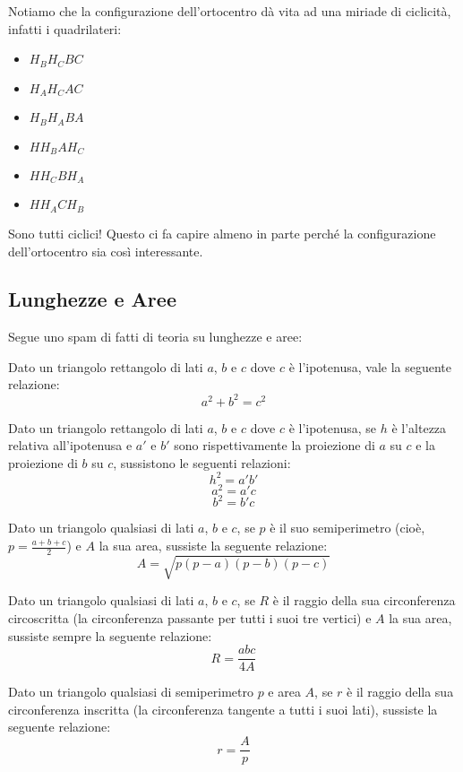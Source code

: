 \documentclass[11pt]{scrartcl}
\begin{document}
	\begin{remark}[Ciclicità ]
		Notiamo che la configurazione dell'ortocentro dà vita ad una miriade di ciclicità, infatti i quadrilateri: 
		\begin{itemize}
			\item $H_BH_CBC$
			\item $H_AH_CAC$
			\item $H_BH_ABA$
			\item $HH_BAH_C$
			\item $HH_CBH_A$
			\item $HH_ACH_B$
		\end{itemize}
		Sono tutti ciclici! Questo ci fa capire almeno in parte perché la configurazione dell'ortocentro sia così interessante.
	\end{remark}
	\subsection{Lunghezze e Aree}
	Segue uno spam di fatti di teoria su lunghezze e aree:
	\begin{theorem}[Pitagora]
		Dato un triangolo rettangolo di lati $a$, $b$ e $c$ dove $c$ è l'ipotenusa, vale la seguente relazione:
		$$a^2+b^2=c^2$$
	\end{theorem}
	\begin{theorem}[Euclide]
		Dato un triangolo rettangolo di lati $a$, $b$ e $c$ dove $c$ è l'ipotenusa, se $h$ è l'altezza relativa all'ipotenusa e $a'$ e $b'$ sono rispettivamente la proiezione di $a$ su $c$ e la proiezione di $b$ su $c$, sussistono le seguenti relazioni:
		$$h^2=a'b'$$
		$$a^2=a'c$$
		$$b^2=b'c$$
	\end{theorem}
	\begin{theorem}[Erone]
		Dato un triangolo qualsiasi di lati $a$, $b$ e $c$, se $p$ è il suo semiperimetro (cioè, $p=\frac{a+b+c}{2}$) e $A$ la sua area, sussiste la seguente relazione:
		$$A=\sqrt{p(p-a)(p-b)(p-c)}$$
	\end{theorem}
	\begin{theorem}[Circumraggio]
		Dato un triangolo qualsiasi di lati $a$, $b$ e $c$, se $R$ è il raggio della sua circonferenza circoscritta (la circonferenza passante per tutti i suoi tre vertici) e $A$ la sua area, sussiste sempre la seguente relazione:
		$$R=\frac{abc}{4A}$$
	\end{theorem}
	\begin{theorem}[Inraggio]
		Dato un triangolo qualsiasi di semiperimetro $p$ e area $A$, se $r$ è il raggio della sua circonferenza inscritta (la circonferenza tangente a tutti i suoi lati), sussiste la seguente relazione:
		$$r=\frac{A}{p}$$
	\end{theorem}
\end{document}
